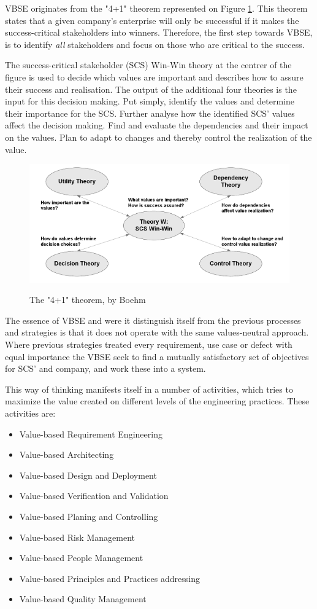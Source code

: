 \documentclass{sig-alternate}
\begin{document}
VBSE originates from the "4+1" theorem represented on Figure \ref{fig:fouronetheorem}. This theorem states that a given company's enterprise will only be successful if it makes the success-critical stakeholders into winners. Therefore, the first step towards VBSE, is to identify \textit{all} stakeholders and  focus on those who are critical to the success.

The success-critical stakeholder (SCS) Win-Win theory at the centrer of the figure is used to decide which values are important and describes how to assure their success and realisation. The output of the additional four theories is the input for this decision making. Put simply, identify the values and determine their importance for the SCS. Further analyse how the identified SCS' values affect the decision making. Find and evaluate the dependencies and their impact on the values. Plan to adapt to changes and thereby control the realization of the value.\cite{stefan:valuebased}

\begin{figure}
\centering
\caption{The "4+1" theorem, by Boehm}
\includegraphics[scale=0.6]{4+1theorem}
\label{fig:fouronetheorem}
\end{figure} 

The essence of VBSE and were it distinguish itself from the previous processes and strategies is that it does not operate with the same values-neutral approach. Where previous strategies treated every requirement, use case or defect with equal importance the VBSE seek to find a mutually satisfactory set of objectives for SCS' and company, and work these into a system.

This way of thinking manifests itself in a number of activities, which tries to maximize the value created on different levels of the engineering practices.
These activities are:
\begin{itemize}
\item Value-based Requirement Engineering
\item Value-based Architecting
\item Value-based Design and Deployment
\item Value-based Verification and Validation
\item Value-based Planing and Controlling 
\item Value-based Risk Management
\item Value-based People Management
\item Value-based Principles and Practices addressing
\item Value-based Quality Management
\end{itemize} 
\end{document}
